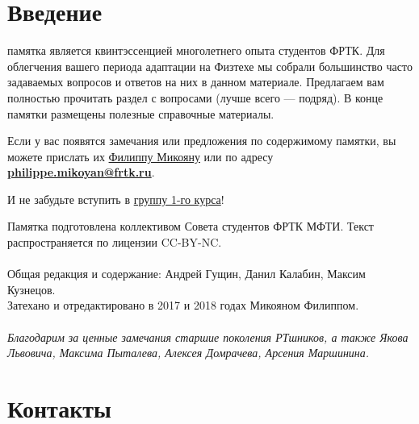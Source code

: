 \documentclass[14pt]{extarticle}
\newenvironment{bottompar}{\par\vspace*{\fill}}{\clearpage}
\begin{document}
\clearpage
\section{Введение}
 памятка является квинтэссенцией многолетнего опыта студентов ФРТК.
Для облегчения вашего периода адаптации на Физтехе мы собрали большинство
часто задаваемых вопросов и ответов на них в данном материале. Предлагаем
вам полностью прочитать раздел с вопросами (лучше всего — подряд). В конце
памятки размещены полезные справочные материалы.

Если у вас появятся замечания или предложения по содержимому памятки, вы
можете прислать их \href{https://vk.com/philalala}{Филиппу Микояну} или по адресу \underline{\textbf{philippe.mikoyan@frtk.ru}}.

И не забудьте вступить в \href{https://vk.com/drec_81x}{группу 1-го курса}!
\begin{bottompar}

Памятка подготовлена коллективом Совета студентов ФРТК МФТИ.
Текст распространяется по лицензии CC-BY-NC.
\\ \\
Общая редакция и содержание: Андрей Гущин, Данил Калабин, Максим Кузнецов.
\\
Затехано и отредактировано в 2017 и 2018 годах Микояном Филиппом.
\\ \\
    \textit{Благодарим за ценные замечания старшие поколения РТшников, а также Якова Львовича, Максима Пыталева, Алексея Домрачева, Арсения Маршинина.}

\end{bottompar}
\clearpage
\section{Контакты}
\end{document}
